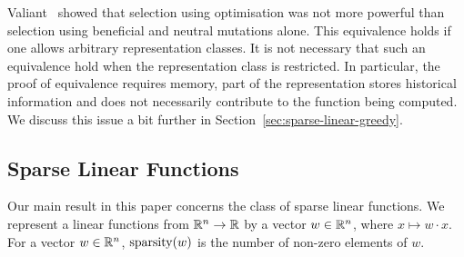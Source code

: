 % 
% 

\begin{remark} Valiant~\cite{Valiant:2009-evolvability} showed that selection
using optimisation was not more powerful than selection using beneficial and
neutral mutations alone. This equivalence holds if one allows arbitrary
representation classes. It is not necessary that such an equivalence hold when
the representation class is restricted. In particular, the proof of equivalence
requires memory, \ie part of the representation stores historical
information and does not necessarily contribute to the function being computed.
We discuss this issue a bit further in Section~\ref{sec:sparse-linear-greedy}.
\end{remark}

\subsection{Sparse Linear Functions} 
\label{sec:notation-class}

Our main result in this paper concerns the class of sparse linear functions.  We
represent a linear functions from $\mathbb{R}^n \rightarrow \mathbb{R}$ by a vector $w
\in \mathbb{R}^n$, where $x \mapsto w \cdot x$.  For a vector $w \in \mathbb{R}^n$,
$\mathrm{sparsity}(w)$ is the number of non-zero elements of $w$.

